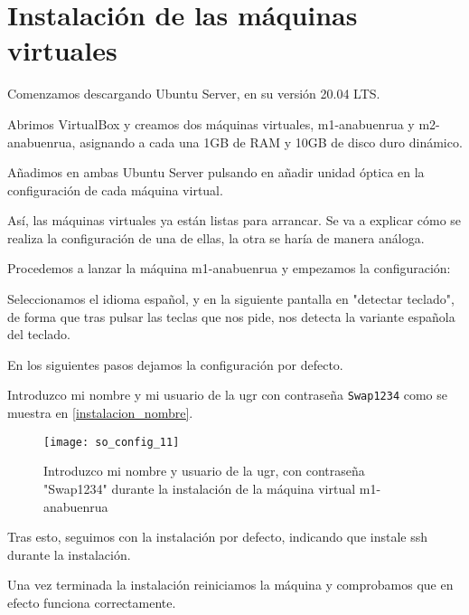 
\chapter{Instalación de las máquinas virtuales}

Comenzamos descargando Ubuntu Server, en su versión 20.04 LTS.

Abrimos VirtualBox y creamos dos máquinas virtuales, m1-anabuenrua y m2-anabuenrua, asignando a cada una 1GB de RAM y 10GB de disco duro dinámico.

Añadimos en ambas Ubuntu Server pulsando en añadir unidad óptica en la configuración de cada máquina virtual.

Así, las máquinas virtuales ya están listas para arrancar. Se va a explicar cómo se realiza la configuración de una de ellas, la otra se haría de manera análoga.

Procedemos a lanzar la máquina m1-anabuenrua y empezamos la configuración:

Seleccionamos el idioma español, y en la siguiente pantalla en "detectar teclado", de forma que tras pulsar las teclas que nos pide, nos detecta la variante española del teclado.

En los siguientes pasos dejamos la configuración por defecto.

Introduzco mi nombre y mi usuario de la ugr con contraseña \verb|Swap1234| como se muestra en \eqref{instalacion_nombre}.

\begin{figure}
\begin{center}
\caption{Introduzco mi nombre y usuario de la ugr, con contraseña "Swap1234"  durante la instalación de la máquina virtual m1-anabuenrua}
\label{instalacion_nombre}
\texttt{[image: so\_config\_11]}
\end{center}
\end{figure}

Tras esto, seguimos con la instalación por defecto, indicando que instale ssh durante la instalación.

Una vez terminada la instalación reiniciamos la máquina y comprobamos que en efecto funciona correctamente.

